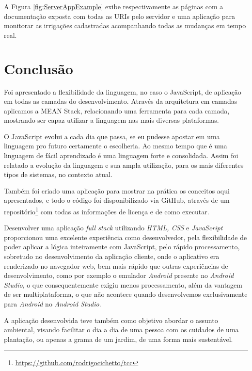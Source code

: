 \documentclass[
	12pt,				%
	openright,			%
	twoside,			%
	a4paper,			%
	english,			%
	brazil				%
	]{abntex2}
\begin{document}
A Figura \ref{fig:ServerAppExample} exibe respectivamente as páginas com a documentação exposta com todas as URIs pelo servidor e uma aplicação para monitorar as irrigações cadastradas acompanhando todas as mudanças em tempo real.


\chapter{Conclusão}
Foi apresentado a flexibilidade da linguagem, no caso o JavaScript, de aplicação em todas as camadas do desenvolvimento. Através da arquitetura em camadas aplicamos a MEAN Stack, relacionando uma ferramenta para cada camada, mostrando ser capaz utilizar a linguagem nas mais diversas plataformas.

O JavaScript evolui a cada dia que passa, se eu pudesse apostar em uma linguagem pro futuro certamente o escolheria. Ao mesmo tempo que é uma linguagem de fácil aprendizado é uma linguagem forte e consolidada. Assim foi relatado a evolução da linguagem e sua ampla utilização, para os mais diferentes tipos de sistemas, no contexto atual.

Também foi criado uma aplicação para mostrar na prática os conceitos aqui apresentados, e todo o código foi disponibilizado via GitHub, através de um repositório\footnote{\url{https://github.com/rodrigocichetto/tcc}} com todas as informações de licença e de como executar.

Desenvolver uma aplicação \textit{full stack} utilizando \textit{HTML, CSS} e \textit{JavaScript} proporcionou uma excelente experiência como desenvolvedor, pela flexibilidade de poder aplicar a lógica inteiramente com JavaScript, pelo rápido processamento, sobretudo no desenvolvimento da aplicação cliente, onde o aplicativo era renderizado no navegador web, bem mais rápido que outras experiências de desenvolvimento, como por exemplo o emulador \textit{Android} presente no \textit{Android Studio}, o que consequentemente exigiu menos processamento, além da vantagem de ser multiplataforma, o que não acontece quando desenvolvemos exclusivamente para \textit{Android} no \textit{Android Studio}.

A aplicação desenvolvida teve também como objetivo abordar o assunto ambiental, visando facilitar o dia a dia de uma pessoa com os cuidados de uma plantação, ou apenas a grama de um jardim, de uma forma mais sustentável.
\end{document}
